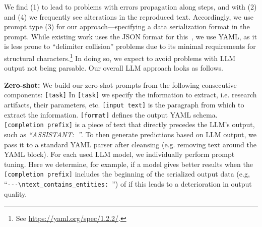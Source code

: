 We find (1) to lead to problems with errors propagation along steps, and with (2) and (4) we frequently see alterations in the reproduced text. Accordingly, we use prompt type (3) for our approach---specifying a data serialization format in the prompt.
While existing work uses the JSON format for this~\cite{Dunn2022}, we use YAML, as it is less prone to ``delimiter collision'' problems due to its minimal requirements for structural characters.\footnote{See \url{https://yaml.org/spec/1.2.2/}.} 
In doing so, we expect to avoid problems with LLM output not being parsable. Our overall LLM approach looks as follows.
%
%

\textbf{Zero-shot:} We build our zero-shot prompts from the following consecutive components: \texttt{[task]\allowbreak[format]}
In \texttt{[task]} we specify the information to extract, i.e. research artifacts, their parameters, etc. \texttt{[input text]} is the paragraph from which to extract the information. \texttt{[format]} defines the output YAML schema. \texttt{[completion prefix]} is a piece of text that directly precedes the LLM's output, such as \textit{``ASSISTANT:~''}.
%
%
To then generate predictions based on LLM output, we pass it to a standard YAML parser after cleansing (e.g. removing text around the YAML block).
%
%
For each used LLM model, we individually perform prompt tuning. Here we determine, for example, if a model gives better results when the \texttt{[completion prefix]} includes the beginning of the serialized output data (e.g, ``\texttt{-{}-{}-\allowbreak\textbackslash n\allowbreak text\_\allowbreak contains\_\allowbreak entities: }'') of if this leads to a deterioration in output quality.

